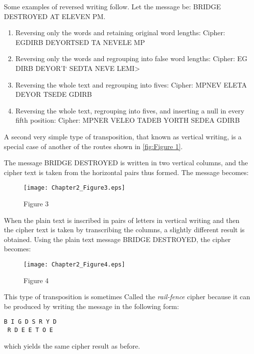 \mypara Some examples of reversed writing follow. Let the message be:
BRIDGE DESTROYED AT ELEVEN PM.

\begin{enumerate}
\item Reversing only the words and retaining original word lengths:
Cipher: EGDIRB DEYORTSED TA NEVELE MP
\item Reversing only the words and regrouping into false word
lengths:
Cipher: EG DIRB DEYOR'I‘ SEDTA NEVE LEMI>
\item Reversing the whole text and regrouping into fives:
Cipher: MPNEV ELETA DEYOR TSEDE GDIRB
\item Reversing the whole text, regrouping into fives, and inserting
a null in every fifth position:
Cipher: MPNER VELEO TADEB YORTH SEDEA GDIRB
\end{enumerate}

\mypara A second very simple type of transposition, that known as vertical
writing, is a special case of another of the routes shown in \ref{fig:Figure 1}.

The message BRIDGE DESTROYED is written in two vertical
columns, and the cipher text is taken from the horizontal pairs
thus formed. The message becomes:

\begin{figure}[h]
  \centering
    \texttt{[image: Chapter2\_Figure3.eps]}
    \label{fig:Figure 3}
    \caption{Figure 3}
\end{figure}

When the plain text is inscribed in pairs of letters in vertical
writing and then the cipher text is taken by transcribing the
columns, a slightly different result is obtained. Using the plain
text message BRIDGE DESTROYED, the cipher becomes:

\begin{figure}[h]
  \centering
    \texttt{[image: Chapter2\_Figure4.eps]}
    \label{fig:Figure 4}
    \caption{Figure 4}
\end{figure}

This type of transposition is sometimes Called the \textit{rail-fence} cipher
because it can be produced by writing the message in the following form:


\begin{verbatim}
B I G D S R Y D
 R D E E T O E
\end{verbatim}

which yields the same cipher result as before.

